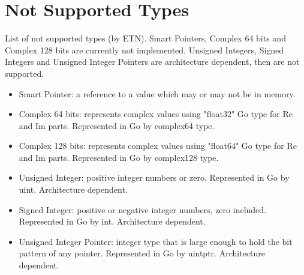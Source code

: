 \section{Not Supported Types}

List of not supported types (by ETN). Smart Pointers, Complex 64 bits and Complex 128 bits are currently not implemented. Unsigned Integers, Signed Integers and Unsigned Integer Pointers are architecture dependent, then are not supported.

\begin{itemize}

	\item Smart Pointer: a reference to a value which may or may not be in memory.
	
	\item Complex 64 bits: represents complex values using "float32" Go type for Re and Im parts. Represented in Go by complex64 type.
	
	\item Complex 128 bits: represents complex values using "float64" Go type for Re and Im parts. Represented in Go by complex128 type.
	
	\item Unsigned Integer: positive integer numbers or zero. Represented in Go by uint. Architecture dependent.
	
	\item Signed Integer: positive or negative integer numbers, zero included. Represented in Go by int. Architecture dependent.
	
	\item Unsigned Integer Pointer: integer type that is large enough to hold the bit pattern of any pointer. Represented in Go by uintptr. Architecture dependent.

\end{itemize}